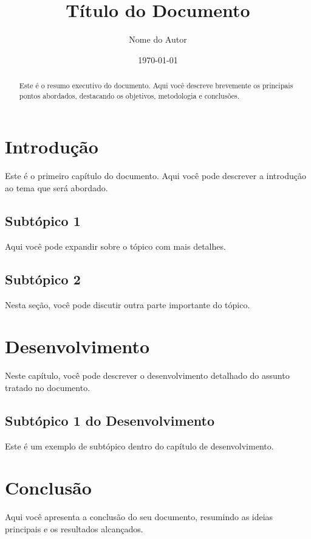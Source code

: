 \documentclass[a4paper,12pt]{report}
\title{Título do Documento}
\author{Nome do Autor}
\date{\today}
\begin{document}
\maketitle
\newpage

\begin{abstract}
Este é o resumo executivo do documento. Aqui você descreve brevemente os principais pontos abordados, destacando os objetivos, metodologia e conclusões.
\end{abstract}
\newpage

\tableofcontents
\newpage

\chapter{Introdução}
Este é o primeiro capítulo do documento. Aqui você pode descrever a introdução ao tema que será abordado.

\section{Subtópico 1}
Aqui você pode expandir sobre o tópico com mais detalhes.

\section{Subtópico 2}
Nesta seção, você pode discutir outra parte importante do tópico.

\chapter{Desenvolvimento}
Neste capítulo, você pode descrever o desenvolvimento detalhado do assunto tratado no documento.

\section{Subtópico 1 do Desenvolvimento}
Este é um exemplo de subtópico dentro do capítulo de desenvolvimento.

\newpage
\chapter{Conclusão}
Aqui você apresenta a conclusão do seu documento, resumindo as ideias principais e os resultados alcançados.
\end{document}
